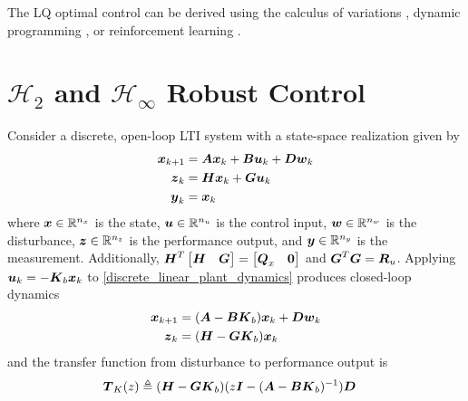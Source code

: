 The LQ optimal control can be derived using the calculus of variations \cite{stengel, kirk}, dynamic programming \cite{bertsekas2012dynamic}, or reinforcement learning \cite{lewis2009reinforcement}.

\section{$\mathcal{H}_{2}$ and $\mathcal{H}_{\infty}$ Robust Control}
Consider a discrete, open-loop LTI system with a state-space realization given by
\begin{subequations}
\begin{align}
	\vb*{x}_{k+1} &= \vb*{A}\vb*{x}_{k} + \vb*{B}\vb*{u}_{k} + \vb*{D}\vb*{w}_{k} \label{discrete_linear_plant_dynamics}\\
	\vb*{z}_{k} &= \vb*{H}\vb*{x}_{k} + \vb*{G}\vb*{u}_{k} \label{discrete_linear_performance}\\
	\vb*{y}_{k} &= \vb*{x}_{k}\label{discrete_linear_plant_measurement}
\end{align} \label{discrete_linear_plant}
\end{subequations}
where $\vb*{x} \in \mathbb{R}^{n_{x}}$ is the state, $\vb*{u} \in \mathbb{R}^{n_{u}}$ is the control input, $\vb*{w} \in \mathbb{R}^{n_{w}}$ is the disturbance, $\vb*{z} \in \mathbb{R}^{n_{z}}$ is the performance output, and $\vb*{y} \in \mathbb{R}^{n_{y}}$ is the measurement.  Additionally, $\vb*{H}^{T} \begin{bmatrix} \vb*{H} & \vb*{G}\end{bmatrix} = \begin{bmatrix} \vb*{Q}_{x} & \vb*{0} \end{bmatrix}$ and $\vb*{G}^{T}\vb*{G} = \vb*{R}_{u}$.  Applying $\vb*{u}_{k} = -\vb*{K}_{b}\vb*{x}_{k}$ to \eqref{discrete_linear_plant_dynamics} produces closed-loop dynamics
\begin{subequations}
\label{discrete_linear_plant_cl}
\begin{align}
	\vb*{x}_{k+1} &= (\vb*{A} - \vb*{B}\vb*{K}_{b})\vb*{x}_{k} + \vb*{D}\vb*{w}_{k} \label{discrete_linear_plant_dynamics_cl}\\
	\vb*{z}_{k} &= (\vb*{H} - \vb*{G}\vb*{K}_{b})\vb*{x}_{k} \label{discrete_linear_performance_cl}
\end{align}
\end{subequations}
and the transfer function from disturbance to performance output is
\begin{equation}
\begin{aligned}
	\vb*{T}_{K}(z) &\triangleq (\vb*{H} - \vb*{G}\vb*{K}_{b})(z\vb*{I} - (\vb*{A} - \vb*{B}\vb*{K}_{b})^{-1})\vb*{D}
\end{aligned} \label{discrete_transfer_matrix}
\end{equation}

